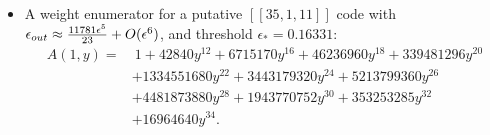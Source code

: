 \documentclass[11pt]{article}
\begin{document}
\begin{itemize}
\item A weight enumerator for a putative $[[35,1,11]]$ code with $\epsilon_{\rm out} \approx  \frac{11781 \epsilon ^5}{23} +O(\epsilon^6)$, and threshold $\epsilon_*=0.16331$:
  \begin{equation}
    \begin{split}
    A(1, y) = & \ 1 + 42840y^{12} + 6715170y^{16} + 46236960y^{18} + 339481296y^{20} \\
              & + 1334551680y^{22} + 3443179320y^{24} + 5213799360y^{26} \\
              & + 4481873880y^{28} + 1943770752y^{30} + 353253285y^{32} \\
              & + 16964640y^{34}.
    \end{split}
\end{equation}

\end{itemize}
\end{document}
